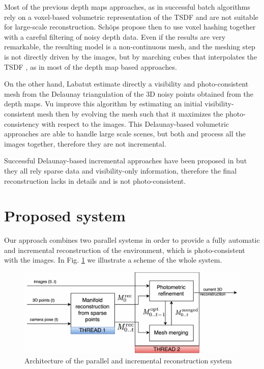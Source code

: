 Most of the previous depth maps approaches, as in successful batch algorithms rely on a voxel-based volumetric representation of the TSDF and are not suitable for large-scale reconstruction. Sch{\"o}ps \etal \cite{schops20153d} propose then to use voxel hashing together with a careful filtering of noisy depth data.
Even if the results are very remarkable, the resulting model is a non-continuous mesh, and the meshing step is not directly driven by the images, but by marching cubes \cite{lorensen1987marching} that interpolates the TSDF , as in most of the depth map based approaches.


On the other hand, Labatut \etal \cite{labatut2007efficient} estimate directly a visibility and photo-consistent mesh from the Delaunay triangulation of the 3D noisy points obtained from the depth maps.
Vu \etal  \cite{vu_et_al_2012} improve this algorithm by estimating an initial visibility-consistent mesh then by evolving the mesh such that it maximizes the photo-consistency with respect to the images. 
This Delaunay-based volumetric approaches are able to handle large scale scenes, but both \cite{labatut2007efficient} and \cite{vu_et_al_2012} process all the images together, therefore they are not incremental.

Successful Delaunay-based incremental approaches have been proposed in \cite{lovi_et_al_11,hoppe2013incremental,litvinov_lhuillier_13,romanoni15b} but they all rely sparse data and visibility-only information, therefore the final reconstruction lacks in details and is not photo-consistent.



\section{Proposed system}
 Our approach combines two parallel systems in order to provide a fully automatic and incremental reconstruction of the environment, which is photo-consistent with the images. In Fig. \ref{fig:architecture} we illustrate a scheme of the whole system.
 
 \begin{figure}[t]
  \centering
  \includegraphics[width=\textwidth]{./img/ch-incr-dens/incremental-mvs-architecture}
  \caption{Architecture of the parallel and incremental reconstruction system}
  \label{fig:architecture}
\end{figure}


